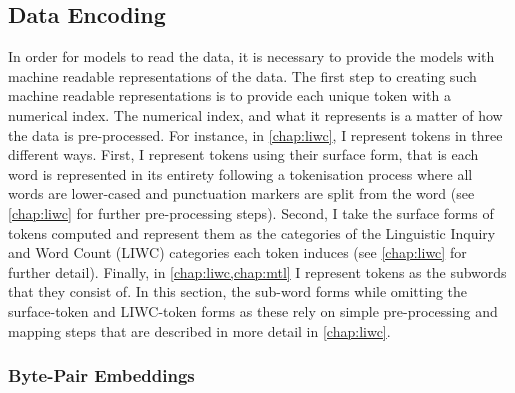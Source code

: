 \subsection{Data Encoding}

In order for models to read the data, it is necessary to provide the models with machine readable representations of the data. The first step to creating such machine readable representations is to provide each unique token with a numerical index.
The numerical index, and what it represents is a matter of how the data is pre-processed. For instance, in \cref{chap:liwc}, I represent tokens in three different ways.
First, I represent tokens using their surface form, that is each word is represented in its entirety following a tokenisation process where all words are lower-cased and punctuation markers are split from the word (see \cref{chap:liwc} for further pre-processing steps). Second, I take the surface forms of tokens computed and represent them as the categories of the Linguistic Inquiry and Word Count (LIWC) categories each token induces (see \cref{chap:liwc} for further detail). Finally, in \cref{chap:liwc,chap:mtl} I represent tokens as the subwords that they consist of. 
In this section, the sub-word forms while omitting the surface-token and LIWC-token forms as these rely on simple pre-processing and mapping steps that are described in more detail in \cref{chap:liwc}.

\subsubsection{Byte-Pair Embeddings}

